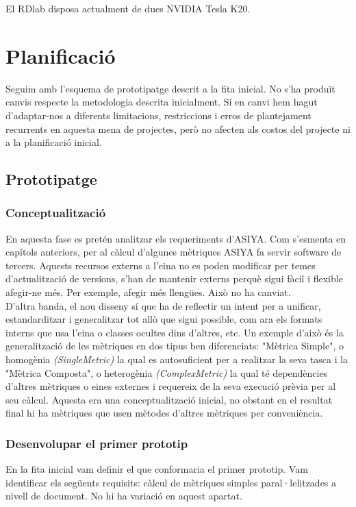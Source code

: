 \documentclass[11pt,a4paper]{article}
\begin{document}
El RDlab disposa actualment de dues NVIDIA Tesla K20\cite{k20}.

\newpage
\section{Planificació}
Seguim amb l'esquema de prototipatge descrit a la fita inicial. No s'ha produït canvis respecte la metodologia descrita inicialment. Sí en canvi hem hagut d'adaptar-nos a diferents limitacions, restriccions i erros de plantejament recurrents en aquesta mena de projectes, però no afecten als costos del projecte ni a la planificació inicial.

\subsection{Prototipatge}

\subsubsection{Conceptualització}
En aquesta fase es pretén analitzar els requeriments d’ASIYA. Com s'esmenta en capítols anteriors, per al càlcul d'algunes mètriques ASIYA fa servir software de tercers. Aquests recursos externs a l'eina no es poden modificar per temes d'actualització de versions, s'han de mantenir externs perquè sigui fàcil i flexible afegir-ne més. Per exemple, afegir més llengües. Això no ha canviat.
\\

D'altra banda, el nou disseny sí que ha de reflectir un intent per a unificar, estandarditzar i generalitzar tot allò que sigui possible, com ara els formats interns que usa l'eina o classes ocultes dins d'altres, etc. Un exemple d'això és la generalització de les mètriques en dos tipus ben diferenciats: "Mètrica Simple", o homogènia \textit{(SingleMetric)} la qual es autosuficient per a realitzar la seva tasca i la "Mètrica Composta", o heterogènia \textit{(ComplexMetric)} la qual té dependències d'altres mètriques o eines externes i requereix de la seva execució prèvia per al seu càlcul. Aquesta era una conceptualització inicial, no obstant en el resultat final hi ha mètriques que usen mètodes d'altres mètriques per conveniència.

\subsubsection{Desenvolupar el primer prototip}
En la fita inicial vam definir el que conformaria el primer prototip. Vam identificar els següents requisits: càlcul de mètriques simples paral·lelitzades a nivell de document. No hi ha variació en aquest apartat.
\end{document}
